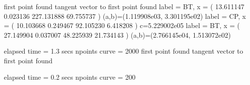 \documentclass[letterpaper,10pt,english]{jupyterBook}
\begin{document}
\begin{sphinxVerbatim}[commandchars=\\\{\}]
\PYG{p}{[}\PYG{p}{]}
\PYG{p}{[}\PYG{p}{]}
\end{sphinxVerbatim}

\begin{sphinxVerbatim}[commandchars=\\\{\}]
first point found
tangent vector to first point found
label = BT, x = ( 13.611147 0.023136 \PYGZhy{}227.131888 69.755737 )
(a,b)=(\PYGZhy{}1.119908e\PYGZhy{}03, \PYGZhy{}3.301195e\PYGZhy{}02)
label = CP, x = ( \PYGZhy{}10.103668 0.249467 92.105230 6.418208 )
c=5.229002e\PYGZhy{}05
label = BT, x = ( \PYGZhy{}27.149904 0.037007 48.225939 21.734143 )
(a,b)=(2.766145e\PYGZhy{}04, 1.513072e\PYGZhy{}02)

elapsed time  = 1.3 secs
npoints curve = 2000
first point found
tangent vector to first point found

elapsed time  = 0.2 secs
npoints curve = 200
\end{sphinxVerbatim}
\end{document}
